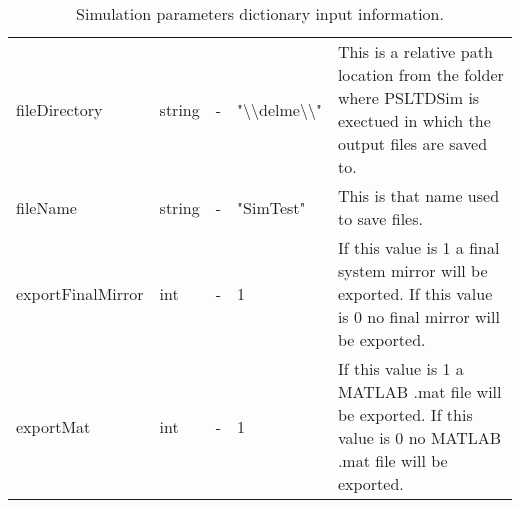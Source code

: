 \begin{landscape}
\begin{table}[!ht]
\begin{tabular}{@{} llllp{5in} @{}}
		fileDirectory	&	string	&	-	&	"\textbackslash\textbackslash delme\textbackslash\textbackslash"	&	This is a relative path location from the folder where PSLTDSim is exectued in which the output files are saved to.	\\
		fileName	&	string	&	-	&	"SimTest"	&	This is that name used to save files.	\\
		exportFinalMirror	&	int	&	-	&	1	&	If this value is 1 a final system mirror will be exported. If this value is 0 no final mirror will be exported.	\\
		exportMat	&	int	&	-	&	1	&	If this value is 1 a MATLAB .mat file will be exported. If this value is 0 no MATLAB .mat file will be exported.	\\
		\bottomrule
	\end{tabular}
	\caption{Simulation parameters dictionary input information.}
	\label{tab:simParamsDict}
\end{table}
\end{landscape}